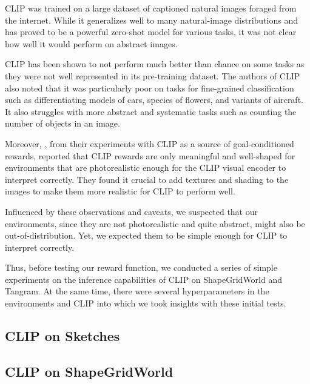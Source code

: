 CLIP was trained on a large dataset of captioned natural images foraged from the internet.
While it generalizes well to many natural-image distributions and has proved to be a powerful zero-shot model for various tasks, it was not clear how well it would perform on abstract images. 

CLIP has been shown to not perform much better than chance on some tasks as they were not well represented in its pre-training dataset.
The authors of CLIP also noted that it was particularly poor on tasks for fine-grained classification such as differentiating models of cars, species of flowers, and variants of aircraft.
It also struggles with more abstract and systematic tasks such as counting the number of objects in an image.

Moreover, \cite{vlmrm}, from their experiments with CLIP as a source of goal-conditioned rewards, reported that CLIP rewards are only meaningful and well-shaped for environments that are photorealistic enough for the CLIP visual encoder to interpret correctly.
They found it crucial to add textures and shading to the images to make them more realistic for CLIP to perform well.

Influenced by these observations and caveats, we suspected that our environments, since they are not photorealistic and quite abstract, might also be out-of-distribution. 
Yet, we expected them to be simple enough for CLIP to interpret correctly.

Thus, before testing our reward function, we conducted a series of simple experiments on the inference capabilities of CLIP on ShapeGridWorld and Tangram.
At the same time, there were several hyperparameters in the environments and CLIP into which we took insights with these initial tests.

\subsection{CLIP on Sketches}
\label{sec:clip-sketches}



\subsection{CLIP on ShapeGridWorld}
\label{sec:clip-sgw}


